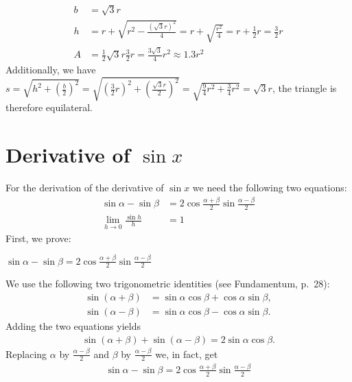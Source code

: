 \documentclass[12pt,eng]{skript_ogg}
\begin{document}
\begin{beispiel}
\begin{enumerate}
\begin{align*}
b &=\sqrt{3}r\\ h &=r+\sqrt{r^2-\frac{(\sqrt{3}r)^2}{4}}=r+\sqrt{\frac{r^2}{4}}=r+\frac{1}{2}r=\frac{3}{2}r\\
A &=\frac{1}{2}\sqrt{3}r\frac{3}{2}r=\frac{3\sqrt{3}}{4}r^2\approx1.3r^2
\end{align*}
Additionally, we have $s=\sqrt{h^2+\left(\frac{b}{2}\right)^2}=\sqrt{\left(\frac{3}{2}r\right)^2+\left(\frac{\sqrt{3}r}{2}\right)^2}=\sqrt{\frac{9}{4}r^2+\frac{3}{4}r^2}=\sqrt{3}r$, the triangle is therefore equilateral.
\end{enumerate}
\end{beispiel}

\newpage

\appendix
\section{Derivative of $\sin x$}\label{sin}
For the derivation of the derivative of $\sin x$ we need the following two equations:
\begin{align*}
\sin\alpha-\sin\beta&=2\cos\frac{\alpha+\beta}{2}\sin\frac{\alpha-\beta}{2}\\
\lim_{h\rightarrow 0}\frac{\sin h}{h}&=1
\end{align*}
First, we prove:

\begin{satz}\label{satzaddtheorem}
$\sin\alpha-\sin\beta=2\cos\frac{\alpha+\beta}{2}\sin\frac{\alpha-\beta}{2}$
\end{satz}
\begin{beweis}
We use the following two trigonometric identities (see
Fundamentum, p.\ 28):
\begin{align*}
\sin(\alpha+\beta )&=\sin \alpha\cos \beta+\cos\alpha\sin\beta ,\\
\sin(\alpha-\beta )&=\sin \alpha\cos \beta-\cos\alpha\sin\beta.
\end{align*}
Adding the two equations yields
\begin{align*}
\sin(\alpha+\beta )+\sin(\alpha-\beta )=2\sin \alpha\cos \beta .
\end{align*}
Replacing $\alpha$ by $\frac{\alpha-\beta}{2}$ and $\beta$
by $\frac{\alpha-\beta}{2}$ we, in fact, get
\begin{align*}
\sin\alpha-\sin\beta=2\cos\frac{\alpha+\beta}{2}\sin\frac{\alpha-\beta}{2}
\end{align*}
\end{beweis}
\end{document}
